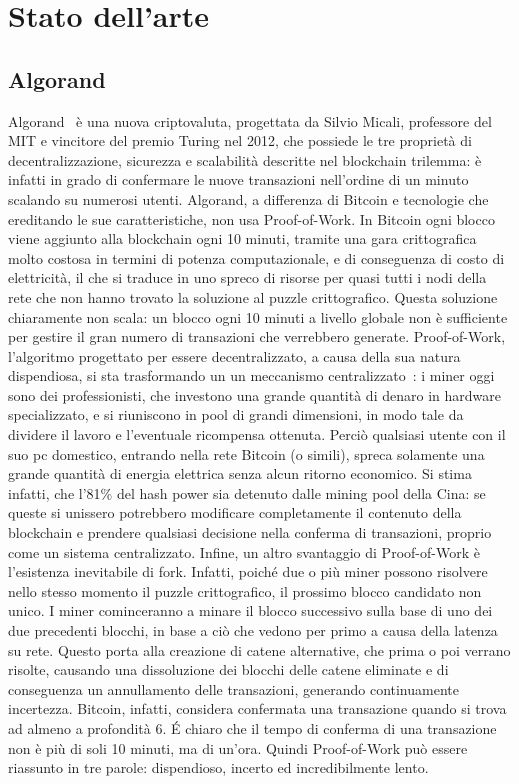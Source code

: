 \chapter{Stato dell'arte}

\section{Algorand}

Algorand~\cite{gilad2017algorand, chen2019algorand} è una nuova criptovaluta, progettata da Silvio Micali, professore del MIT e vincitore del premio Turing nel 2012, che possiede le tre proprietà di decentralizzazione, sicurezza e scalabilità descritte nel blockchain trilemma: è infatti in grado di confermare le nuove transazioni nell'ordine di un minuto scalando su numerosi utenti. Algorand, a differenza di Bitcoin e tecnologie che ereditando le sue caratteristiche, non usa Proof-of-Work. In Bitcoin ogni blocco viene aggiunto alla blockchain ogni 10 minuti, tramite una gara crittografica molto costosa in termini di potenza computazionale, e di conseguenza di costo di elettricità, il che si traduce in uno spreco di risorse per quasi tutti i nodi della rete che non hanno trovato la soluzione al puzzle crittografico. Questa soluzione chiaramente non scala: un blocco ogni 10 minuti a livello globale non è sufficiente per gestire il gran numero di transazioni che verrebbero generate.
Proof-of-Work, l'algoritmo progettato per essere decentralizzato, a causa della sua natura dispendiosa, si sta trasformando un un meccanismo centralizzato~\cite{bitcoin2019centralization}: i miner oggi sono dei professionisti, che investono una grande quantità di denaro in hardware specializzato, e si riuniscono in pool di grandi dimensioni, in modo tale da dividere il lavoro e l'eventuale ricompensa ottenuta. Perciò qualsiasi utente con il suo pc domestico, entrando nella rete Bitcoin (o simili), spreca solamente una grande quantità di energia elettrica senza alcun ritorno economico. Si stima infatti, che l'81\% del hash power sia detenuto dalle mining pool della Cina: se queste si unissero potrebbero modificare completamente il contenuto della blockchain e prendere qualsiasi decisione nella conferma di transazioni, proprio come un sistema centralizzato.
Infine, un altro svantaggio di Proof-of-Work è l'esistenza inevitabile di fork. Infatti, poiché due o più miner possono risolvere nello stesso momento il puzzle crittografico, il prossimo blocco candidato non unico. I miner cominceranno a minare il blocco successivo sulla base di uno dei due precedenti blocchi, in base a ciò che vedono per primo a causa della latenza su rete. Questo porta alla creazione di catene alternative, che prima o poi verrano risolte, causando una dissoluzione dei blocchi delle catene eliminate e di conseguenza un annullamento delle transazioni, generando continuamente incertezza. Bitcoin, infatti, considera confermata una transazione quando si trova ad almeno a profondità 6. \'E chiaro che il tempo di conferma di una transazione non è più di soli 10 minuti, ma di un'ora. Quindi Proof-of-Work può essere riassunto in tre parole: dispendioso, incerto ed incredibilmente lento.

